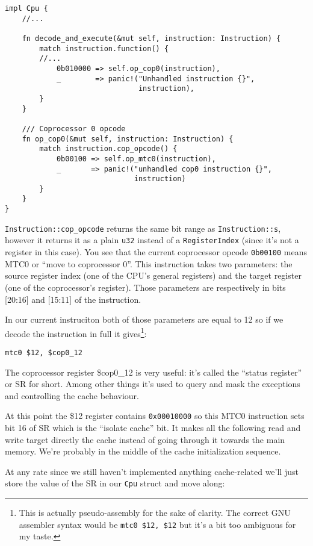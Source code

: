 \documentclass[a4paper]{article}
\newcommand{\code}[1] {\texttt{#1}}
\begin{document}
\begin{lstlisting}
impl Cpu {
    //...

    fn decode_and_execute(&mut self, instruction: Instruction) {
        match instruction.function() {
	    //...
            0b010000 => self.op_cop0(instruction),
            _        => panic!("Unhandled instruction {}",
                               instruction),
        }
    }

    /// Coprocessor 0 opcode
    fn op_cop0(&mut self, instruction: Instruction) {
        match instruction.cop_opcode() {
            0b00100 => self.op_mtc0(instruction),
            _       => panic!("unhandled cop0 instruction {}",
                              instruction)
        }
    }
}
\end{lstlisting}

\code{Instruction::cop\_opcode} returns the same bit range as
\code{Instruction::s}, however it returns it as a plain \code{u32}
instead of a \code{RegisterIndex} (since it's not a register in this
case). You see that the current coprocessor opcode \code{0b00100} means
MTC0 or ``move to coprocessor 0''. This instruction takes two
parameters: the source register index (one of the CPU's general
registers) and the target register (one of the coprocessor's
register). Those parameters are respectively in bits [20:16] and
[15:11] of the instruction.

In our current instruciton both of those parameters are equal to 12 so
if we decode the instruction in full it gives\footnote{This is
  actually pseudo-assembly for the sake of clarity. The correct GNU
  assembler syntax would be \mbox{\code{mtc0 \$12, \$12}} but it's a
bit too ambiguous for my taste.}:

\begin{lstlisting}[language=assembly]
mtc0 $12, $cop0_12
\end{lstlisting}

The coprocessor register \$cop0\_12 is very useful: it's called the
``status register'' or SR for short. Among other things it's used to
query and mask the exceptions and controlling the cache behaviour.

At this point the \$12 register contains \code{0x00010000} so this
MTC0 instruction sets bit 16 of SR which is the ``isolate cache''
bit. It makes all the following read and write target directly the
cache instead of going through it towards the main memory. We're
probably in the middle of the cache initialization sequence.

At any rate since we still haven't implemented anything cache-related
we'll just store the value of the SR in our \code{Cpu} struct and
move along:
\end{document}
